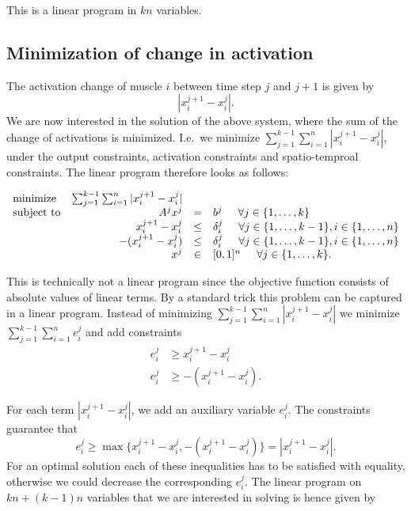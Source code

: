This is a linear program in $kn$ variables.



\subsection{Minimization of change in activation} %
\label{sub:minimization_of_change_in_activation}
The activation change of muscle $i$ between time step $j$ and $j+1$ is given by
\[|x_i^{j+1} - x_i^{j}|.\]
We are now interested in the solution of the above system, where the sum of the change of activations is minimized. I.e.\ we minimize $\sum_{j=1}^{k-1}\sum_{i=1}^n |x_i^{j+1} - x_i^{j}|$, under the output constraints, activation constraints and spatio-temproal constraints. The linear program therefore looks as follows:

\begin{equation}
\begin{array}{lrcl}
\mbox{minimize} & \sum_{j=1}^{k-1} \sum_{i=1}^n |x_i^{j+1} - x_i^{j}| \\ 
\mbox{subject to} & A^j x^j &=& b^j \hspace{5mm} \forall j \in \{1,\dots, k\} \\
  & x_i^{j+1} - x_i^{j} &\leq& \delta_i^j  \hspace{5mm} \forall j \in \{1,\dots, k-1\}, i \in \{1,\dots,n\} \\
  &  -(x_i^{j+1} - x_i^{j}) &\leq& \delta_i^j  \hspace{5mm} \forall j \in \{1,\dots, k-1\}, i \in \{1,\dots,n\} \\
  & x^j &\in& [0,1]^n \hspace{5mm} \forall j \in \{1,\dots, k\}.
\end{array}
\end{equation}

This is technically not a linear program since the objective function consists of absolute values of linear terms. By a standard trick this problem can be captured in a linear program. Instead of minimizing $\sum_{j=1}^{k-1} \sum_{i=1}^n |x_i^{j+1} - x_i^{j}|$ we minimize $\sum_{j=1}^{k-1} \sum_{i=1}^n e_i^j$ and add constraints 
\begin{align*}
e_i^j &\geq x_i^{j+1} - x_i^{j} \\
e_i^j &\geq - (x_i^{j+1} - x_i^{j}).
\end{align*}

For each term $|x_i^{j+1} - x_i^{j}|$, we add an auxiliary variable $e_i^j$. The constraints guarantee that 
\[e_i^j \geq \max\{x_i^{j+1} - x_i^{j}, - (x_i^{j+1} - x_i^{j})\} = |x_i^{j+1} - x_i^{j}|.\]
For an optimal solution each of these inequalities has to be satisfied with equality, otherwise we could decrease the corresponding $e_i^j$. The linear program on $kn + (k-1)n$ variables that we are interested in solving is hence given by

